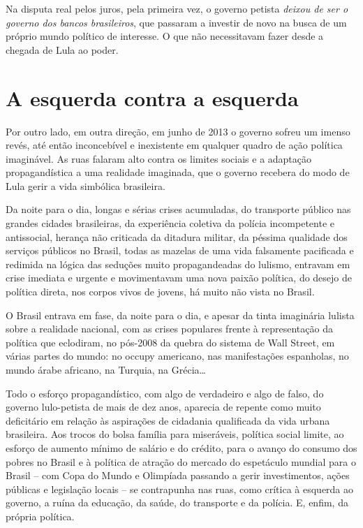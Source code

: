 Na disputa real pelos juros, pela primeira vez, o governo petista
\emph{deixou de ser o governo dos bancos brasileiros}, que passaram a
investir de novo na busca de um próprio mundo político de interesse. O
que não necessitavam fazer desde a chegada de Lula ao poder.

  \section{A esquerda contra a
  esquerda}\label{a-esquerda-contra-a-esquerda}

Por outro lado, em outra direção, em junho de 2013 o governo sofreu um
imenso revés, até então inconcebível e inexistente em qualquer quadro de
ação política imaginável. As ruas falaram alto contra os limites sociais
e a adaptação propagandística a uma realidade imaginada, que o governo
recebera do modo de Lula gerir a vida simbólica brasileira.

Da noite para o dia, longas e sérias crises acumuladas, do transporte
público nas grandes cidades brasileiras, da experiência coletiva da
polícia incompetente e antissocial, herança não criticada da ditadura
militar, da péssima qualidade dos serviços públicos no Brasil, todas as
mazelas de uma vida falsamente pacificada e redimida na lógica das
seduções muito propagandeadas do lulismo, entravam em crise imediata e
urgente e movimentavam uma nova paixão política, do desejo de política
direta, nos corpos vivos de jovens, há muito não vista no Brasil.

O Brasil entrava em fase, da noite para o dia, e apesar da tinta
imaginária lulista sobre a realidade nacional, com as crises populares
frente à representação da política que eclodiram, no pós-2008 da quebra
do sistema de Wall Street, em várias partes do mundo: no occupy
americano, nas manifestações espanholas, no mundo árabe africano, na
Turquia, na Grécia…

Todo o esforço propagandístico, com algo de verdadeiro e algo de falso,
do governo lulo-petista de mais de dez anos, aparecia de repente como
muito deficitário em relação às aspirações de cidadania qualificada da
vida urbana brasileira. Aos trocos do bolsa família para miseráveis,
política social limite, ao esforço de aumento mínimo de salário e do
crédito, para o avanço do consumo dos pobres no Brasil e à política de
atração do mercado do espetáculo mundial para o Brasil -- com Copa do
Mundo e Olimpíada passando a gerir investimentos, ações públicas e
legislação locais -- se contrapunha nas ruas, como crítica à esquerda ao
governo, a ruína da educação, da saúde, do transporte e da polícia. E,
enfim, da própria política.

